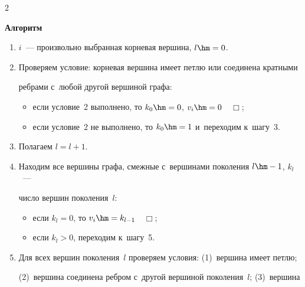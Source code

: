 \begin{multicols}{2}
\begin{center}


{\bf Алгоритм}


\end{center}





\vspace*{-6pt}





\noindent


\begin{enumerate}


\item $i$~--- произвольно выбранная корневая вершина, $l\hm=0$.


\item Проверяем условие: корневая вершина имеет петлю или соединена кратными 


ребрами с~любой другой вершиной графа:


\begin{itemize}


\item если условие~2 выполнено, то $k_0\hm=0$, $v_i\hm=0$~~$\Box$;


\item если условие~2 не выполнено, то $k_0\hm=1$ и~переходим к~шагу~3.


\end{itemize}


\item Полагаем $l=l+1$.


\item Находим все вершины графа, смежные с~вершинами поколения $l\hm-1$, $k_l$~--- 


число вершин поколения~$l$:


\begin{itemize}


\item если $k_l=0$, то $v_i\hm=k_{l-1}$~~$\Box$;


\item если $k_l>0$, переходим к~шагу~5.


\end{itemize}


\item Для всех вершин поколения~$l$ проверяем условия: (1)~вершина имеет петлю; 


(2)~вершина соединена ребром с~другой вершиной поколения~$l$; (3)~вершина 



\end{enumerate}
\end{multicols}
